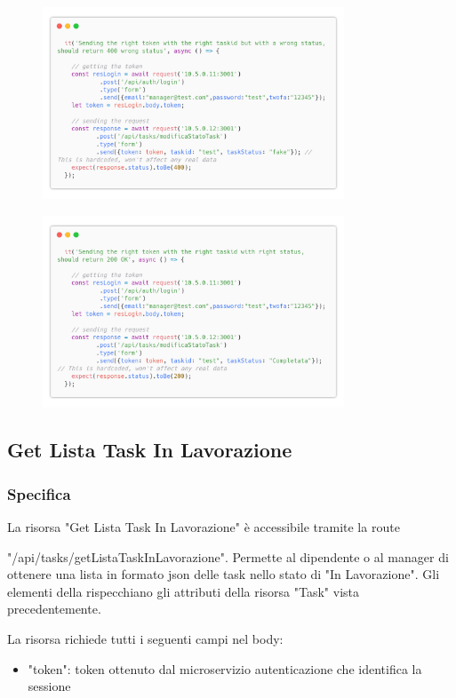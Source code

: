 \documentclass{report}
\begin{document}
\begin{figure}[H]
	\centering\includegraphics[width=0.8\textwidth]{images/code_modifica_stato_test5.png}
\end{figure}
\begin{figure}[H]
	\centering\includegraphics[width=0.8\textwidth]{images/code_modifica_stato_test6.png}
\end{figure}


\subsection{Get Lista Task In Lavorazione}
\subsubsection*{Specifica}

La risorsa "Get Lista Task In Lavorazione" è accessibile tramite la route

 "/api/tasks/getListaTaskInLavorazione". Permette al dipendente o al manager di ottenere una lista in formato json delle task nello stato di "In Lavorazione". Gli elementi della rispecchiano gli attributi della risorsa "Task" vista precedentemente.

La risorsa richiede tutti i seguenti campi nel body:
\begin{itemize}
	\item "token": token ottenuto dal microservizio autenticazione che identifica la sessione
\end{itemize}
\end{document}

